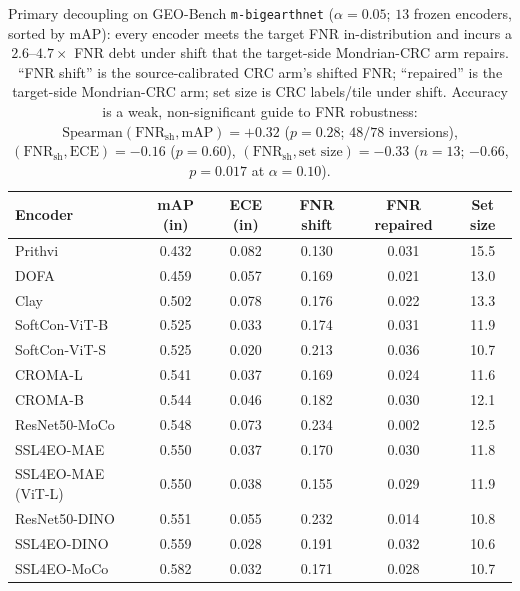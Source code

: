 \documentclass[11pt]{article}
\begin{document}
\begin{table}[t]\centering\small
\caption{Primary decoupling on GEO-Bench \texttt{m-bigearthnet} ($\alpha{=}0.05$; $13$ frozen encoders,
sorted by mAP): every encoder meets the target FNR in-distribution and incurs a $2.6$--$4.7\times$ FNR
debt under shift that the target-side Mondrian-CRC arm repairs. ``FNR shift'' is the source-calibrated
CRC arm's shifted FNR; ``repaired'' is the target-side Mondrian-CRC arm; set size is CRC labels/tile under
shift. Accuracy is a weak, non-significant guide to FNR robustness:
$\mathrm{Spearman}(\mathrm{FNR}_{\mathrm{sh}},\mathrm{mAP})=+0.32$ ($p{=}0.28$; $48/78$ inversions),
$(\mathrm{FNR}_{\mathrm{sh}},\mathrm{ECE})=-0.16$ ($p{=}0.60$),
$(\mathrm{FNR}_{\mathrm{sh}},\text{set size})=-0.33$ ($n{=}13$; $-0.66$, $p{=}0.017$ at
$\alpha{=}0.10$).}\label{tab:fnrdecouple}
\begin{tabular}{lccccc}
\toprule
Encoder & mAP (in) & ECE (in) & FNR shift & FNR repaired & Set size \\
\midrule
Prithvi              & 0.432 & 0.082 & 0.130 & 0.031 & 15.5 \\
DOFA                 & 0.459 & 0.057 & 0.169 & 0.021 & 13.0 \\
Clay                 & 0.502 & 0.078 & 0.176 & 0.022 & 13.3 \\
SoftCon-ViT-B        & 0.525 & 0.033 & 0.174 & 0.031 & 11.9 \\
SoftCon-ViT-S        & 0.525 & 0.020 & 0.213 & 0.036 & 10.7 \\
CROMA-L              & 0.541 & 0.037 & 0.169 & 0.024 & 11.6 \\
CROMA-B              & 0.544 & 0.046 & 0.182 & 0.030 & 12.1 \\
ResNet50-MoCo        & 0.548 & 0.073 & 0.234 & 0.002 & 12.5 \\
SSL4EO-MAE           & 0.550 & 0.037 & 0.170 & 0.030 & 11.8 \\
SSL4EO-MAE (ViT-L)   & 0.550 & 0.038 & 0.155 & 0.029 & 11.9 \\
ResNet50-DINO        & 0.551 & 0.055 & 0.232 & 0.014 & 10.8 \\
SSL4EO-DINO          & 0.559 & 0.028 & 0.191 & 0.032 & 10.6 \\
SSL4EO-MoCo          & 0.582 & 0.032 & 0.171 & 0.028 & 10.7 \\
\bottomrule
\end{tabular}
\end{table}
\end{document}
